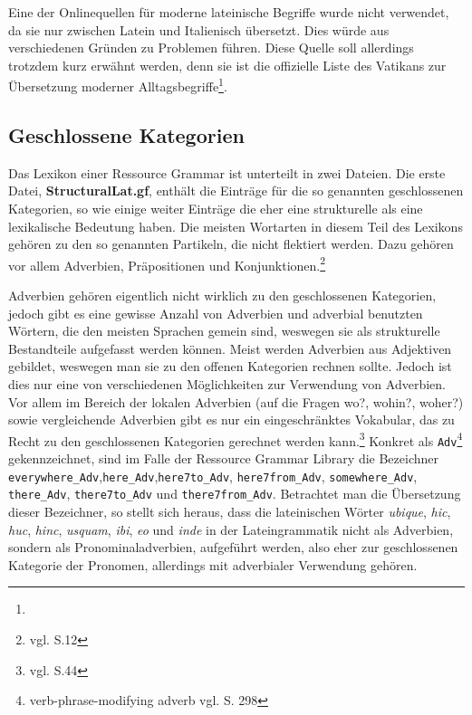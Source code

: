 \documentclass[fontsize=12pt,abstract=on,titlepage,bibliography=totoc,ngerman,listof=totoc]{scrreprt}
\begin{document}
Eine der Onlinequellen für moderne lateinische Begriffe wurde nicht verwendet, da sie nur zwischen Latein und Italienisch übersetzt. Dies würde aus verschiedenen Gründen zu Problemen führen. Diese Quelle soll allerdings trotzdem kurz erwähnt werden, denn sie ist die offizielle Liste des Vatikans zur Übersetzung moderner Alltagsbegriffe\footnote{\vatlatinitas}.
\subsection{Geschlossene Kategorien}
\label{subsec:geschlossene}
Das Lexikon einer Ressource Grammar ist unterteilt in zwei Dateien. Die erste Datei, \textbf{StructuralLat.gf}, enthält die Einträge für die so genannten geschlossenen Kategorien, so wie einige weiter Einträge die eher eine strukturelle als eine lexikalische Bedeutung haben. Die meisten Wortarten in diesem Teil des Lexikons gehören zu den so genannten Partikeln, die nicht flektiert werden. Dazu gehören vor allem Adverbien, Präpositionen und Konjunktionen.\footnote{vgl. \cite{BAYER-LINDAUER1994} S.12} \par
Adverbien gehören eigentlich nicht wirklich zu den geschlossenen Kategorien, jedoch gibt es eine gewisse Anzahl von Adverbien und adverbial benutzten Wörtern, die den meisten Sprachen gemein sind, weswegen sie als strukturelle Bestandteile aufgefasst werden können. Meist werden Adverbien aus Adjektiven gebildet, weswegen man sie zu den offenen Kategorien rechnen sollte. Jedoch ist dies nur eine von verschiedenen Möglichkeiten zur Verwendung von Adverbien. Vor allem im  Bereich der lokalen Adverbien (auf die Fragen wo?, wohin?, woher?) sowie vergleichende Adverbien gibt es nur ein eingeschränktes Vokabular, das zu Recht zu den geschlossenen Kategorien gerechnet werden kann.\footnote{vgl. \cite{BAYER-LINDAUER1994} S.44} 
Konkret als \texttt{Adv}\footnote{verb-phrase-modifying adverb vgl. \cite{RANTA2011} S. 298} gekennzeichnet, sind im Falle der Ressource Grammar Library die Bezeichner \texttt{everywhere\_Adv},\texttt{here\_Adv},\texttt{here7to\_Adv}, \texttt{here7from\_Adv}, \texttt{somewhere\_Adv}, \texttt{there\_Adv}, \texttt{there7to\_Adv} und \texttt{there7from\_Adv}. Betrachtet man die Übersetzung dieser Bezeichner, so stellt sich heraus, dass die lateinischen Wörter \textit{ubique}, \textit{hic}, \textit{huc}, \textit{hinc}, \textit{usquam}, \textit{ibi}, \textit{eo} und \textit{inde} in der Lateingrammatik nicht als Adverbien, sondern als Pronominaladverbien, aufgeführt werden, also eher zur geschlossenen Kategorie der Pronomen, allerdings mit adverbialer Verwendung gehören. \par
\end{document}
